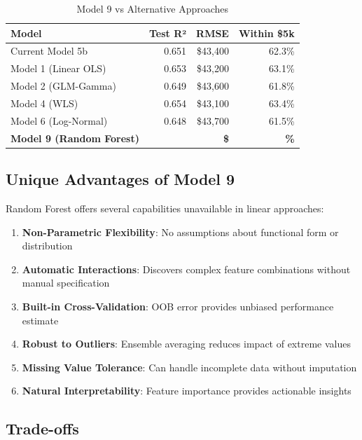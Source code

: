 \begin{table}[h]
\centering
\caption{Model 9 vs Alternative Approaches}
\begin{tabular}{lrrr}
\toprule
\textbf{Model} & \textbf{Test R²} & \textbf{RMSE} & \textbf{Within \$5k} \\
\midrule
Current Model 5b & 0.651 & \$43,400 & 62.3\% \\
Model 1 (Linear OLS) & 0.653 & \$43,200 & 63.1\% \\
Model 2 (GLM-Gamma) & 0.649 & \$43,600 & 61.8\% \\
Model 4 (WLS) & 0.654 & \$43,100 & 63.4\% \\
Model 6 (Log-Normal) & 0.648 & \$43,700 & 61.5\% \\
\textbf{Model 9 (Random Forest)} & \textbf{\ModelNineRSquaredTest{}} & \textbf{\$\ModelNineRMSETest{}} & \textbf{\ModelNineWithinFiveK{}\%} \\
\bottomrule
\end{tabular}
\label{tab:model9_comparison}
\end{table}

\subsection{Unique Advantages of Model 9}

Random Forest offers several capabilities unavailable in linear approaches:

\begin{enumerate}
    \item \textbf{Non-Parametric Flexibility}: No assumptions about functional form or distribution
    \item \textbf{Automatic Interactions}: Discovers complex feature combinations without manual specification
    \item \textbf{Built-in Cross-Validation}: OOB error provides unbiased performance estimate
    \item \textbf{Robust to Outliers}: Ensemble averaging reduces impact of extreme values
    \item \textbf{Missing Value Tolerance}: Can handle incomplete data without imputation
    \item \textbf{Natural Interpretability}: Feature importance provides actionable insights
\end{enumerate}

\subsection{Trade-offs}

